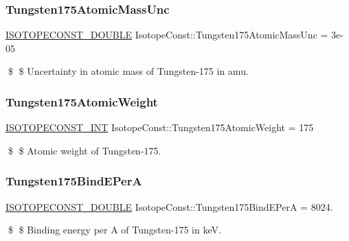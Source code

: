 \subsubsection{\texorpdfstring{Tungsten175\+Atomic\+Mass\+Unc}{Tungsten175AtomicMassUnc}}
{\footnotesize\ttfamily \mbox{\hyperlink{group___isotope_const-_macros_ga8f45a7272ce02c0b4c65c44636ed719a}{I\+S\+O\+T\+O\+P\+E\+C\+O\+N\+S\+T\+\_\+\+D\+O\+U\+B\+LE}} Isotope\+Const\+::\+Tungsten175\+Atomic\+Mass\+Unc = 3e-\/05}

\$ \$ Uncertainty in atomic mass of Tungsten-\/175 in amu. \mbox{\label{group___isotope_const-_tungsten-_w175_ga31873c7bf860db3ea10504cebd63126c}} 
\subsubsection{\texorpdfstring{Tungsten175\+Atomic\+Weight}{Tungsten175AtomicWeight}}
{\footnotesize\ttfamily \mbox{\hyperlink{group___isotope_const-_macros_ga5f18360b3e99483a35c32d789e62621c}{I\+S\+O\+T\+O\+P\+E\+C\+O\+N\+S\+T\+\_\+\+I\+NT}} Isotope\+Const\+::\+Tungsten175\+Atomic\+Weight = 175}

\$ \$ Atomic weight of Tungsten-\/175. \mbox{\label{group___isotope_const-_tungsten-_w175_ga4e59eee0ee625f21acb18b89beeaa333}} 
\subsubsection{\texorpdfstring{Tungsten175\+Bind\+E\+PerA}{Tungsten175BindEPerA}}
{\footnotesize\ttfamily \mbox{\hyperlink{group___isotope_const-_macros_ga8f45a7272ce02c0b4c65c44636ed719a}{I\+S\+O\+T\+O\+P\+E\+C\+O\+N\+S\+T\+\_\+\+D\+O\+U\+B\+LE}} Isotope\+Const\+::\+Tungsten175\+Bind\+E\+PerA = 8024.}

\$ \$ Binding energy per A of Tungsten-\/175 in keV. \mbox{\label{group___isotope_const-_tungsten-_w175_gaf0786e54e059d4997f0cca81ea77337f}} 
